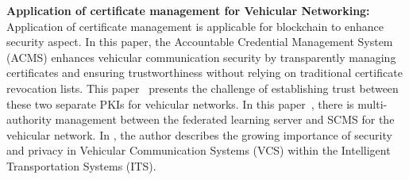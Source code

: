 \textbf{Application of certificate management for Vehicular Networking:} Application of certificate management is applicable for blockchain to enhance security aspect. In this paper\cite{khan2020accountable}, the Accountable Credential Management System (ACMS) enhances vehicular communication security by transparently managing certificates and ensuring trustworthiness without relying on traditional certificate revocation lists. This paper~\cite{byunx2023privacy} presents the challenge of establishing trust between these two separate PKIs for vehicular networks. In this paper~\cite{byun2024secure}, there is multi-authority management between the federated learning server and SCMS for the vehicular network. In \cite{lei2020blockchain}, the author describes the growing importance of security and privacy in Vehicular Communication Systems (VCS) within the Intelligent Transportation Systems (ITS).      




